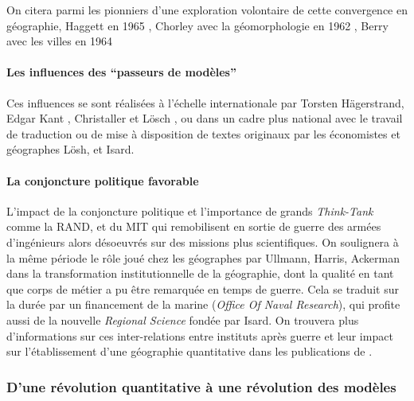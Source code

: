 On citera parmi les pionniers d'une exploration volontaire de cette convergence en géographie, Haggett en 1965 \autocite{Haggett1965}, Chorley avec la géomorphologie en 1962 \autocite{Chorley1962}, Berry avec les villes en 1964 \autocite{Berry1964a}

\paragraph{Les influences des \enquote{passeurs de modèles}}


Ces influences se sont réalisées à l'échelle internationale par Torsten Hägerstrand, Edgar Kant , Christaller et Lösch \autocite[119]{Berry1970}, ou dans un cadre plus national avec le travail de traduction ou de mise à disposition de textes originaux par les économistes et géographes Lösh, et Isard.

\paragraph{La conjoncture politique favorable}

L'impact de la conjoncture politique et l'importance de grands \textit{Think-Tank} comme la RAND, et du MIT qui remobilisent en sortie de guerre des armées d'ingénieurs alors désoeuvrés sur des missions plus scientifiques. On soulignera à la même période le rôle joué chez les géographes par Ullmann, Harris, Ackerman dans la transformation institutionnelle de la géographie, dont la qualité en tant que corps de métier a pu être remarquée en temps de guerre. Cela se traduit sur la durée par un financement de la marine (\textit{Office Of Naval Research}), qui profite aussi de la nouvelle \textit{Regional Science} fondée par Isard. On trouvera plus d'informations sur ces inter-relations entre instituts après guerre et leur impact sur l'établissement d'une géographie quantitative dans les publications de \textcite{Barnes2006a}.

\subsubsection{D'une révolution quantitative à une révolution des modèles}
\label{ssec:revol_modele}


